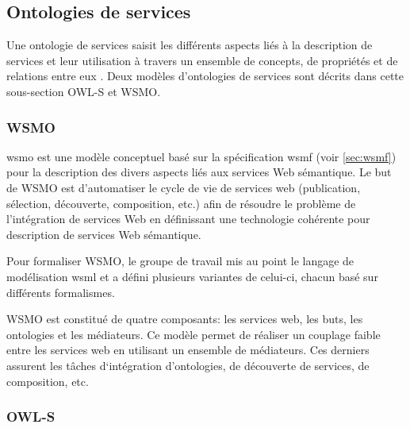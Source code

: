   \subsection{Ontologies de services}
  \label{sec:ontologies-services}

  Une ontologie de services saisit les différents aspects liés à la
  description de services et leur utilisation à travers un ensemble de
  concepts, de propriétés et de relations entre eux
  \cite{elie2010}. Deux modèles d'ontologies de services sont décrits
  dans cette sous-section \textsc{OWL-S} et \textsc{WSMO}.

    \subsubsection{WSMO}
    \label{sec:wsmo}

    \acrshort{wsmo} \cite{de2005web} est une modèle conceptuel basé
    sur la spécification \acrshort{wsmf} \cite{fensel2002web} (voir
    \ref{sec:wsmf}) pour la description des divers aspects liés aux
    services Web sémantique. Le but de \textsc{WSMO} est d'automatiser
    le cycle de vie de services web (publication, sélection,
    découverte, composition, etc.) afin de résoudre le problème de
    l'intégration de services Web en définissant une technologie
    cohérente pour description de services Web sémantique.\medskip

    Pour formaliser \textsc{WSMO}, le groupe de travail mis au point
    le langage de modélisation \acrshort{wsml} \cite{de2006web} et a
    défini plusieurs variantes de celui-ci, chacun basé sur différents
    formalismes.\medskip

    \textsc{WSMO} est constitué de quatre composants: les services
    web, les buts, les ontologies et les médiateurs. Ce modèle permet
    de réaliser un couplage faible entre les services web en utilisant
    un ensemble de médiateurs. Ces derniers assurent les tâches
    d‘intégration d'ontologies, de découverte de services, de
    composition, etc.

    \subsubsection{OWL-S}
    \label{sec:owl-s-1}

